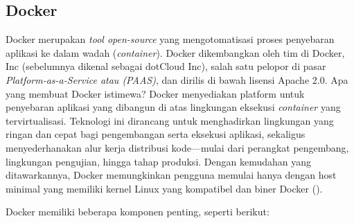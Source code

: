 \subsection{Docker}

\justifying Docker merupakan \emph{tool open-source} yang mengotomatisasi proses penyebaran aplikasi ke dalam wadah (\emph{container}). Docker dikembangkan oleh tim di Docker, Inc (sebelumnya dikenal sebagai dotCloud Inc), salah satu pelopor di pasar \emph{Platform-as-a-Service atau (PAAS)}, dan dirilis di bawah lisensi Apache 2.0. Apa yang membuat Docker istimewa? Docker menyediakan platform untuk penyebaran aplikasi yang dibangun di atas lingkungan eksekusi \emph{container} yang tervirtualisasi. Teknologi ini dirancang untuk menghadirkan lingkungan yang ringan dan cepat bagi pengembangan serta eksekusi aplikasi, sekaligus menyederhanakan alur kerja distribusi kode—mulai dari perangkat pengembang, lingkungan pengujian, hingga tahap produksi. Dengan kemudahan yang ditawarkannya, Docker memungkinkan pengguna memulai hanya dengan host minimal yang memiliki kernel Linux yang kompatibel dan biner Docker (\cite{turnbull2014docker}).

Docker memiliki beberapa komponen penting, seperti berikut:


